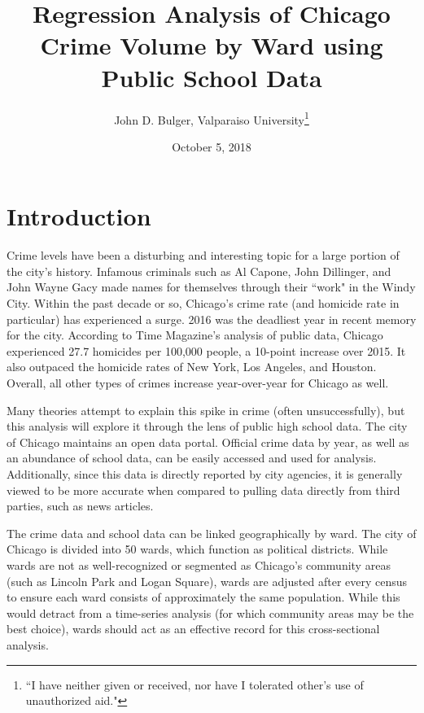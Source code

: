 \documentclass[12pt]{article}
\title{Regression Analysis of Chicago Crime Volume by Ward using Public School Data}
\author{John D. Bulger, Valparaiso University\thanks{``I have neither given or received, nor have I tolerated other’s use of unauthorized aid."}}
\date{October 5, 2018}
\begin{document}
\begin{titlepage}
	\maketitle
\end{titlepage}

	\section{Introduction}
	
Crime levels have been a disturbing and interesting topic for a large portion of the city's history.  Infamous criminals such as Al Capone, John Dillinger, and John Wayne Gacy made names for themselves through their ``work" in the Windy City.  Within the past decade or so, Chicago’s crime rate (and homicide rate in particular) has experienced a surge.  2016 was the deadliest year in recent memory for the city.  According to Time Magazine's analysis of public data, Chicago experienced 27.7 homicides per 100,000 people, a 10-point increase over 2015.  It also outpaced the homicide rates of New York, Los Angeles, and Houston.  Overall, all other types of crimes increase year-over-year for Chicago as well.\cite{sanburn}

\par

Many theories attempt to explain this spike in crime (often unsuccessfully), but this analysis will explore it through the lens of public high school data.  The city of Chicago maintains an open data portal.  Official crime data by year, as well as an abundance of school data, can be easily accessed and used for analysis.  Additionally, since this data is directly reported by city agencies, it is generally viewed to be more accurate when compared to pulling data directly from third parties, such as news articles.

\par

The crime data and school data can be linked geographically by ward.  The city of Chicago is divided into 50 wards, which function as political districts.  While wards are not as well-recognized or segmented as Chicago’s community areas (such as Lincoln Park and Logan Square), wards are adjusted after every census to ensure each ward consists of approximately the same population.  While this would detract from a time-series analysis (for which community areas may be the best choice), wards should act as an effective record for this cross-sectional analysis.
\end{document}
